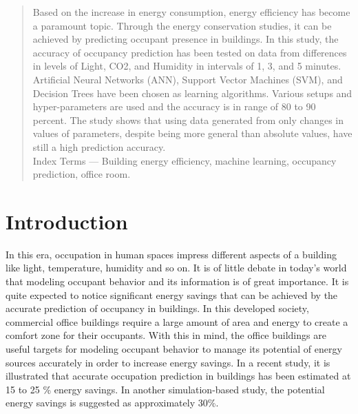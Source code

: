 \documentclass[conference]{IEEEtran}
\begin{document}
\maketitle

\begin{abstract}
Based on the increase in energy
consumption, energy efficiency has become a
paramount topic. Through the energy conservation
studies, it can be achieved by predicting occupant
presence in buildings. In this study, the accuracy of
occupancy prediction has been tested on data from
differences in levels of Light, CO2, and Humidity in
intervals of 1, 3, and 5 minutes. Artificial Neural
Networks (ANN), Support Vector Machines (SVM), and
Decision Trees have been chosen as learning
algorithms. Various setups and hyper-parameters are
used and the accuracy is in range of 80 to 90 percent.
The study shows that using data generated from only
changes in values of parameters, despite being more
general than absolute values, have still a high prediction
accuracy.\\

Index Terms --- Building energy efficiency, machine
learning, occupancy prediction, office room.
\end{abstract}



\section{Introduction}
In this era, occupation in human spaces impress
different aspects of a building like light, temperature,
humidity and so on. It is of little debate in today’s world
that modeling occupant behavior and its information is of
great importance. It is quite expected to notice significant
energy savings that can be achieved by the accurate
prediction of occupancy in buildings. In this developed
society, commercial office buildings require a large
amount of area and energy to create a comfort zone for
their occupants\cite{OccMeasure}. With this in mind, the office buildings are useful targets for modeling occupant behavior to manage its potential of energy sources accurately in order to increase energy savings. In a recent study, it is illustrated that accurate occupation prediction in buildings has been estimated at 15 to 25 \% energy savings\cite{ReductoHVAC}. In another simulation-based study\cite{SensorOcc}, the potential energy savings is suggested as approximately 30\%.\\
\end{document}
